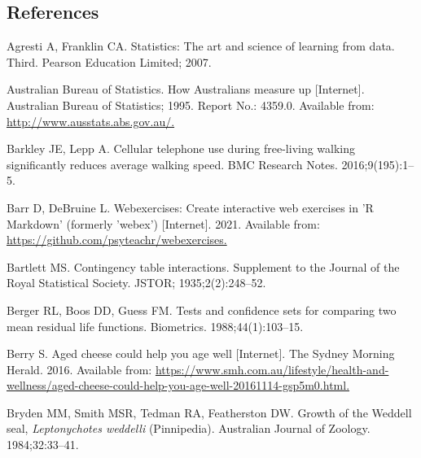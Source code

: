 \documentclass[
  11pt,
  a4paper,
  krantz2]{krantz}
\newlength{\cslhangindent}
\newenvironment{CSLReferences}[2] %
 {\begin{list}{}{%
  \setlength{\itemindent}{0pt}
  \setlength{\leftmargin}{0pt}
  \setlength{\parsep}{0pt}
  \ifodd #1
   \setlength{\leftmargin}{\cslhangindent}
   \setlength{\itemindent}{-1\cslhangindent}
  \fi
  \setlength{\itemsep}{#2\baselineskip}}}
 {\end{list}}
\begin{document}
\begin{footnotesize}

\chapter*{References}\label{references}


\label{refs}
\begin{CSLReferences}{1}{0}
Agresti A, Franklin CA. Statistics: {T}he art and science of learning from data. Third. Pearson Education Limited; 2007.

Australian Bureau of Statistics. How {A}ustralians measure up {[}Internet{]}. {A}ustralian {B}ureau of {S}tatistics; 1995. Report No.: 4359.0. Available from: \href{http://www.ausstats.abs.gov.au/}{http://www.ausstats.abs.gov.au/.}

Barkley JE, Lepp A. Cellular telephone use during free-living walking significantly reduces average walking speed. {BMC} Research Notes. 2016;9(195):1--5.

Barr D, DeBruine L. Webexercises: Create interactive web exercises in '{R Markdown}' (formerly 'webex') {[}Internet{]}. 2021. Available from: \href{https://github.com/psyteachr/webexercises}{https://github.com/psyteachr/webexercises.}

Bartlett MS. Contingency table interactions. Supplement to the Journal of the Royal Statistical Society. JSTOR; 1935;2(2):248--52.

Berger RL, Boos DD, Guess FM. Tests and confidence sets for comparing two mean residual life functions. Biometrics. 1988;44(1):103--15.

Berry S. Aged cheese could help you age well {[}Internet{]}. The Sydney Morning Herald. 2016. Available from: \href{https://www.smh.com.au/lifestyle/health-and-wellness/aged-cheese-could-help-you-age-well-20161114-gsp5m0.html}{https://www.smh.com.au/lifestyle/health-and-wellness/aged-cheese-could-help-you-age-well-20161114-gsp5m0.html.}

Bryden MM, Smith MSR, Tedman RA, Featherston DW. Growth of the {W}eddell seal, {\emph{Leptonychotes weddelli}} ({P}innipedia). {A}ustralian Journal of Zoology. 1984;32:33--41.


\end{CSLReferences}
\end{footnotesize}
\end{document}
